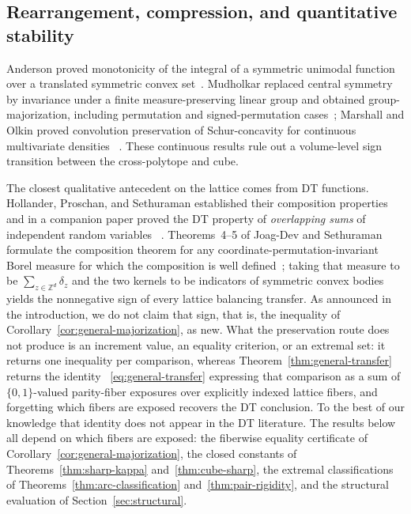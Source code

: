 \documentclass[pdflatex,sn-mathphys-num]{sn-jnl}
\theoremstyle{thmstyleone}
\theoremstyle{thmstylethree}
\theoremstyle{thmstyletwo}
\newcommand{\Z}{\mathbb Z}
\begin{document}
\subsection{Rearrangement, compression, and quantitative stability}

Anderson proved monotonicity of the integral of a symmetric unimodal function
over a translated symmetric convex set~\cite{Anderson55}.  Mudholkar replaced
central symmetry by invariance under a finite measure-preserving linear group
and obtained group-majorization, including permutation and signed-permutation
cases~\cite{Mudholkar66}; Marshall and Olkin proved convolution preservation
of Schur-concavity for continuous multivariate densities
~\cite{MarshallOlkin74}.  These continuous results rule out a volume-level
sign transition between the cross-polytope and cube.

The closest qualitative antecedent on the lattice comes from DT functions.
Hollander, Proschan, and Sethuraman established their composition properties
~\cite{HollanderProschanSethuraman77} and in a companion paper proved the DT
property of \emph{overlapping sums} of independent random variables
~\cite{HollanderProschanSethuraman81}.  Theorems~4--5 of Joag-Dev and
Sethuraman formulate the composition theorem for any
coordinate-permutation-invariant Borel measure for which the composition is
well defined~\cite{JoagDevSethuraman92}; taking that measure to be
$\sum_{z\in\Z^d}\delta_z$ and the two kernels to be indicators of symmetric
convex bodies yields the nonnegative sign of every lattice balancing
transfer.  As announced in the introduction, we do not claim that sign, that
is, the inequality of Corollary~\ref{cor:general-majorization}, as new.  What
the preservation route does not produce is an increment value, an equality
criterion, or an extremal set: it returns one inequality per comparison,
whereas Theorem~\ref{thm:general-transfer} returns the identity
~\eqref{eq:general-transfer} expressing that comparison as a sum of
$\{0,1\}$-valued parity-fiber exposures over explicitly indexed lattice
fibers, and forgetting which fibers are exposed recovers the DT conclusion.
To the best of our knowledge that identity does not appear in the DT
literature.  The results below all depend on which fibers are exposed: the
fiberwise equality certificate of
Corollary~\ref{cor:general-majorization}, the closed constants of
Theorems~\ref{thm:sharp-kappa} and~\ref{thm:cube-sharp}, the extremal
classifications of Theorems~\ref{thm:arc-classification}
and~\ref{thm:pair-rigidity}, and the structural evaluation of
Section~\ref{sec:structural}.
\end{document}
